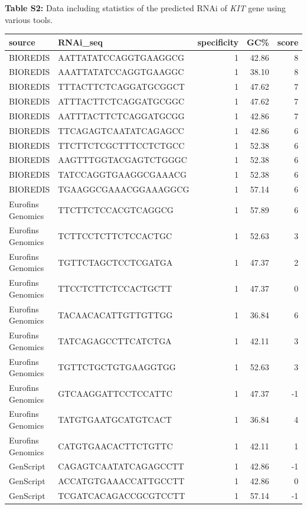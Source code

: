 \documentclass[
]{article}
\begin{document}
\textbf{Table S2:} Data including statistics of the predicted RNAi of
\emph{KIT} gene using various tools.

\newpage

\begin{longtable}[]{@{}llrrr@{}}
\toprule\noalign{}
source & RNAi\_seq & specificity & GC\% & score \\
\midrule\noalign{}
\endhead
\bottomrule\noalign{}
\endlastfoot
BIOREDIS & AATTATATCCAGGTGAAGGCG & 1 & 42.86 & 8 \\
BIOREDIS & AAATTATATCCAGGTGAAGGC & 1 & 38.10 & 8 \\
BIOREDIS & TTTACTTCTCAGGATGCGGCT & 1 & 47.62 & 7 \\
BIOREDIS & ATTTACTTCTCAGGATGCGGC & 1 & 47.62 & 7 \\
BIOREDIS & AATTTACTTCTCAGGATGCGG & 1 & 42.86 & 7 \\
BIOREDIS & TTCAGAGTCAATATCAGAGCC & 1 & 42.86 & 6 \\
BIOREDIS & TTCTTCTCGCTTTCCTCTGCC & 1 & 52.38 & 6 \\
BIOREDIS & AAGTTTGGTACGAGTCTGGGC & 1 & 52.38 & 6 \\
BIOREDIS & TATCCAGGTGAAGGCGAAACG & 1 & 52.38 & 6 \\
BIOREDIS & TGAAGGCGAAACGGAAAGGCG & 1 & 57.14 & 6 \\
Eurofins Genomics & TTCTTCTCCACGTCAGGCG & 1 & 57.89 & 6 \\
Eurofins Genomics & TCTTCCTCTTCTCCACTGC & 1 & 52.63 & 3 \\
Eurofins Genomics & TGTTCTAGCTCCTCGATGA & 1 & 47.37 & 2 \\
Eurofins Genomics & TTCCTCTTCTCCACTGCTT & 1 & 47.37 & 0 \\
Eurofins Genomics & TACAACACATTGTTGTTGG & 1 & 36.84 & 6 \\
Eurofins Genomics & TATCAGAGCCTTCATCTGA & 1 & 42.11 & 3 \\
Eurofins Genomics & TGTTCTGCTGTGAAGGTGG & 1 & 52.63 & 3 \\
Eurofins Genomics & GTCAAGGATTCCTCCATTC & 1 & 47.37 & -1 \\
Eurofins Genomics & TATGTGAATGCATGTCACT & 1 & 36.84 & 4 \\
Eurofins Genomics & CATGTGAACACTTCTGTTC & 1 & 42.11 & 1 \\
GenScript & CAGAGTCAATATCAGAGCCTT & 1 & 42.86 & -1 \\
GenScript & ACCATGTGAAACCATTGCCTT & 1 & 42.86 & 0 \\
GenScript & TCGATCACAGACCGCGTCCTT & 1 & 57.14 & -1 \\

\end{longtable}
\end{document}
